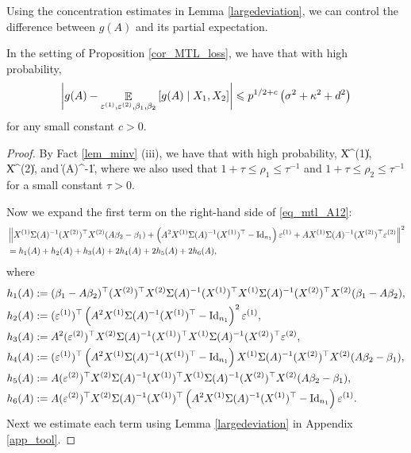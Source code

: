 Using the concentration estimates in Lemma \ref{largedeviation}, we can control the difference between $g(A)$ and its partial expectation. %
 \begin{claim}\label{claim_largedev1}
 In the setting of Proposition \ref{cor_MTL_loss}, we have that with high probability,
$$\left| g(A) - \mathop{\mathbb{E}}_{\varepsilon^{(1)}, \varepsilon^{(2)} ,\beta_1,\beta_2}\left[ g(A) \mid X_1, X_2  \right]\right| \leqslant p^{1/2+c} \left(\sigma^2 + \kappa^2+d^2 \right) $$
for any small constant $c>0$.
 \end{claim}
 \begin{proof}
By Fact \ref{lem_minv} (iii), we have that with high probability,
 \be\label{op_X12}
\|X^{(1)}\|\le {}\lesssim {}, \quad \|X^{(2)}\|\le {}\lesssim {}, 
 \ee
 and
 \be\label{op_Sig1}
\| \Sigma(A)^{-1}\|\le {}\lesssim {},
 \ee
 where we also used that $1+\tau\le \rho_1\le \tau^{-1}$ and $1+\tau\le \rho_2\le \tau^{-1}$ for a small constant $\tau>0$. 
 
 Now we expand the first term on the right-hand side of \eqref{eq_mtl_A12}: 
 \begin{align}
 & \left\| X^{(1)} \Sigma(A)^{-1} (X^{(2)})^\top X^{(2)} (A\beta_2-\beta_1)+ \left(A^2 X^{(1)}\Sigma(A)^{-1} (X^{(1)})^\top-\operatorname{Id}_{n_1}\right)\varepsilon^{(1)} + A X^{(1)}\Sigma(A)^{-1} (X^{(2)})^\top \varepsilon^{(2)} \right\|^2 \nonumber\\
 &=h_1(A) + h_2(A) +h_3(A) + 2h_4(A) + 2h_5(A) + 2h_6(A) ,\label{expand_6}
 \end{align}
 where
 \begin{align*}
&h_1(A):=  (\beta_1-A\beta_2)^\top (X^{(2)})^\top X^{(2)}  \Sigma(A)^{-1}  (X^{(1)})^\top X^{(1)} \Sigma(A)^{-1} (X^{(2)})^\top X^{(2)} (\beta_1-A\beta_2)  ,\\
& h_2(A) := {(\varepsilon^{(1)})^\top \left(A^2 X^{(1)}\Sigma(A)^{-1} (X^{(1)})^\top-\operatorname{Id}_{n_1}\right)^2\varepsilon^{(1)}}  ,\\
& h_3(A):=  A^2 { (\varepsilon^{(2)} )^\top X^{(2)} \Sigma(A)^{-1}  (X^{(1)})^\top X^{(1)}\Sigma(A)^{-1} (X^{(2)})^\top \varepsilon^{(2)}} , \\
& h_4(A):=  (\varepsilon^{(1)})^\top\left(A^2 X^{(1)}\Sigma(A)^{-1} (X^{(1)})^\top-\operatorname{Id}_{n_1}\right) X^{(1)} \Sigma(A)^{-1} (X^{(2)})^\top X^{(2)} (A\beta_2-\beta_1), \\
&h_5(A):=A (\varepsilon^{(2)})^\top X^{(2)}\Sigma(A)^{-1} (X^{(1)})^\top X^{(1)} \Sigma(A)^{-1} (X^{(2)})^\top X^{(2)} (A\beta_2-\beta_1),\\
&h_6(A):=A (\varepsilon^{(2)})^\top X^{(2)}\Sigma(A)^{-1} (X^{(1)})^\top\left(A^2 X^{(1)}\Sigma(A)^{-1} (X^{(1)})^\top-\operatorname{Id}_{n_1}\right)\varepsilon^{(1)}.
\end{align*}
Next we estimate each term using Lemma \ref{largedeviation} in Appendix \ref{app_tool}.


\end{proof}
